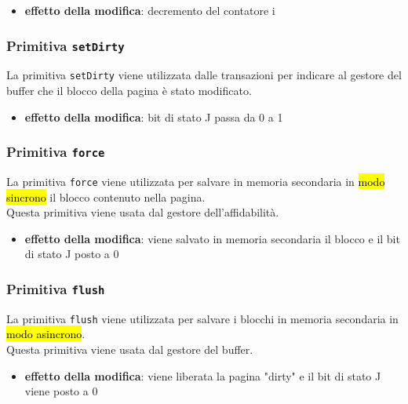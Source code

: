 \begin{itemize}[label=$\Rightarrow$]
  \item \textbf{effetto della modifica}: decremento del contatore i
\end{itemize}

\subsubsection{Primitiva \protect\texttt{setDirty}}
La \textcolor{azzurrino}{primitiva \texttt{setDirty}} viene utilizzata dalle transazioni per indicare al gestore del buffer che il blocco della pagina è stato modificato.

\begin{itemize}[label=$\Rightarrow$]
  \item \textbf{effetto della modifica}: bit di stato J passa da 0 a 1
\end{itemize}

\subsubsection{Primitiva \protect\texttt{force}}
La \textcolor{azzurrino}{primitiva \texttt{force}} viene utilizzata per salvare in memoria secondaria in \hl{modo sincrono} il blocco contenuto nella pagina.\\[0.2ex]
Questa primitiva viene usata dal gestore dell'affidabilità.

\begin{itemize}[label=$\Rightarrow$]
  \item \textbf{effetto della modifica}: viene salvato in memoria secondaria il blocco e il bit di stato J posto a 0
\end{itemize}

\subsubsection{Primitiva \protect\texttt{flush}}
La \textcolor{azzurrino}{primitiva \texttt{flush}} viene utilizzata per salvare i blocchi in memoria secondaria in \hl{modo asincrono}.\\[0.2ex]
Questa primitiva viene usata dal gestore del buffer.

\begin{itemize}[label=$\Rightarrow$]
  \item \textbf{effetto della modifica}: viene liberata la pagina "dirty" e il bit di stato J viene posto a 0
\end{itemize}

